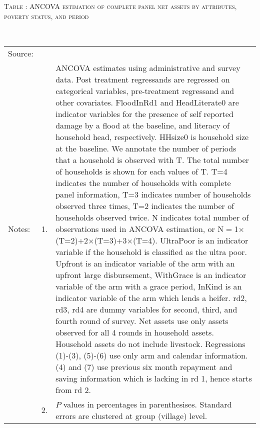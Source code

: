 \hspace{-1cm}\begin{minipage}[t]{14cm}
\hfil\textsc{\normalsize Table \thetable: ANCOVA estimation of complete panel net assets by attributes, poverty status, and period\label{tab ANCOVA narrow complete panel net assets timevarying poverty status attributes}}\\
\setlength{\tabcolsep}{1pt}
\setlength{\baselineskip}{8pt}
\renewcommand{\arraystretch}{.55}
\hfil{}\\
\renewcommand{\arraystretch}{.8}
\setlength{\tabcolsep}{1pt}
\begin{tabular}{>{\hfill\scriptsize}p{1cm}<{}>{\hfill\scriptsize}p{.25cm}<{}>{\scriptsize}p{12cm}<{\hfill}}
Source:& \multicolumn{2}{l}{\scriptsize Estimated with GUK administrative and survey data.}\\
Notes: & 1. & ANCOVA estimates using administrative and survey data. Post treatment regressands are regressed on categorical variables, pre-treatment regressand and other covariates. \textsf{FloodInRd1} and \textsf{HeadLiterate0} are indicator variables for the presence of self reported damage by a flood at the baseline, and literacy of household head, respectively. \textsf{HHsize0} is household size at the baseline. We annotate the number of periods that a household is observed with \textsf{T}. The total number of households is shown for each values of \textsf{T}. \textsf{T=4} indicates the number of households with complete panel information, \textsf{T=3} indicates number of households observed three times, \textsf{T=2} indicates the number of households observed twice. \textsf{N} indicates total number of observations used in ANCOVA estimation, or \textsf{N$=$1$\times$(T=2)+2$\times$(T=3)+3$\times$(T=4)}.  \textsf{UltraPoor} is an indicator variable if the household is classified as the ultra poor. \textsf{Upfront} is an indicator variable of the arm with an upfront large disbursement, \textsf{WithGrace} is an indicator variable of the arm with a grace period, \textsf{InKind} is an indicator variable of the arm which lends a heifer. \textsf{rd2, rd3, rd4} are dummy variables for second, third, and fourth round of survey. Net assets use only assets observed for all 4 rounds in household assets. Household assets do not include livestock. Regressions (1)-(3), (5)-(6) use only arm and calendar information. (4) and (7) use previous six month repayment and saving information which is lacking in rd 1, hence starts from rd 2.\\
& 2. & $P$ values in percentages in parenthesises. Standard errors are clustered at group (village) level.
\end{tabular}
\end{minipage}


